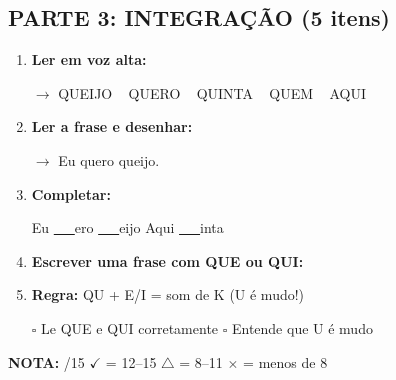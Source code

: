 \begin{exercicio}
\subsection*{PARTE 3: INTEGRAÇÃO (5 itens)}

\begin{enumerate}[resume]
  \item \textbf{Ler em voz alta:}
  \begin{center}
  $\rightarrow$ QUEIJO  ~  QUERO  ~  QUINTA  ~  QUEM  ~  AQUI
  \end{center}

  \item \textbf{Ler a frase e desenhar:}
  \begin{center}
  $\rightarrow$ Eu quero queijo.
  \end{center}
  \begin{center}
  \end{center}

  \item \textbf{Completar:}
  \begin{center}
  Eu \underline{~~~}ero \quad \underline{~~~}eijo \quad Aqui \quad \underline{~~~}inta
  \end{center}

  \item \textbf{Escrever uma frase com QUE ou QUI:}
  \begin{center}
  \underline{\hspace{12cm}}
  \end{center}

  \item \textbf{Regra:} QU + E/I = som de K (U é mudo!)
  \begin{center}
  $\square$ Le QUE e QUI corretamente \quad $\square$ Entende que U é mudo
  \end{center}
\end{enumerate}

\noindent\textbf{NOTA:} \underline{\hspace{1cm}}/15 \quad $\checkmark$ = 12--15 \quad $\triangle$ = 8--11 \quad $\times$ = menos de 8
\end{exercicio}


